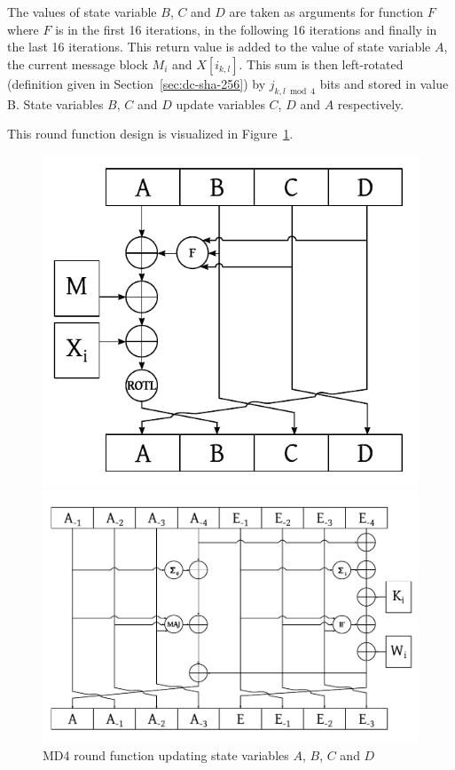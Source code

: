 \begin{description}
    The values of state variable $B$, $C$ and $D$ are taken as arguments
    for function $F$ where $F$ is  in the first 16 iterations,
     in the following 16 iterations and finally 
    in the last 16 iterations. This return value is added to the value of state
    variable $A$, the current message block $M_i$ and $X[i_{k,l}]$.
    This sum is then left-rotated (definition given in Section~\ref{sec:dc-sha-256}) by
    $j_{k,l \bmod{4}}$ bits and stored in value B. State variables $B$, $C$ and
    $D$ update variables $C$, $D$ and $A$ respectively.

    This round function design is visualized in Figure~\ref{fig:md4-round-function}.
\end{description}

\begin{figure}[p]
  \begin{center}
    \includegraphics{img/md4.pdf}
    \caption{MD4 round function updating state variables $A$, $B$, $C$ and $D$}
    \label{fig:md4-round-function}
  \end{center}
  \begin{center}
    \includegraphics[width=\textwidth]{img/sha256.pdf}

\end{center}
\end{figure}
